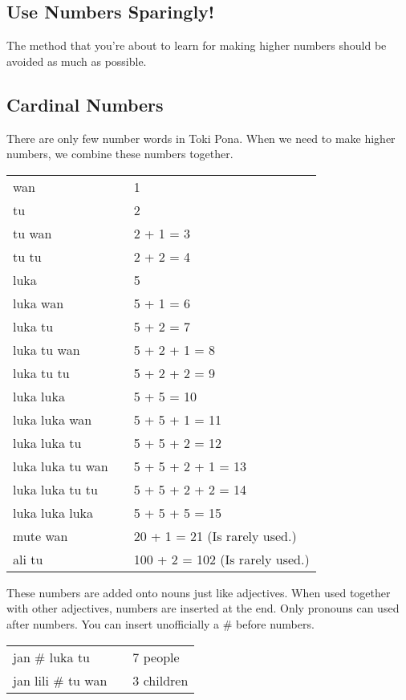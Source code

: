 \subsection*{Use Numbers Sparingly!}
%
The method that you're about to learn for making higher numbers should be avoided as much as possible. 
%
\subsection*{Cardinal Numbers}
%
There are only few number words in Toki Pona.
When we need to make higher numbers, we combine these numbers together. 

\begin{supertabular}{p{5,5cm}|ll}
wan && 1 \\ 
tu  && 2 \\ 
tu wan && 2 + 1 = 3 \\
tu tu && 2 + 2 = 4 \\
luka && 5 \\
luka wan && 5 + 1 = 6 \\
luka tu && 5 + 2 = 7 \\
luka tu wan && 5 + 2 + 1 = 8 \\
luka tu tu && 5 + 2 + 2 = 9 \\
luka luka && 5 + 5 = 10 \\
luka luka wan && 5 + 5 + 1 = 11 \\
luka luka tu && 5 + 5 + 2 = 12 \\
luka luka tu wan && 5 + 5 + 2 + 1 = 13 \\
luka luka tu tu && 5 + 5 + 2 + 2 = 14 \\
luka luka luka && 5 + 5 + 5 = 15 \\
mute wan && 20 + 1 = 21 (Is rarely used.) \\
ali tu && 100 + 2 = 102 (Is rarely used.) \\
\end{supertabular} 

These numbers are added onto nouns just like adjectives. 
When used together with other adjectives, numbers are inserted at the end.
Only pronouns can used after numbers.
You can insert unofficially a \# before numbers. 

\begin{supertabular}{p{5,5cm}|ll}
jan \# luka tu && 7 people \\
jan lili \# tu wan && 3 children \\
\end{supertabular} 

